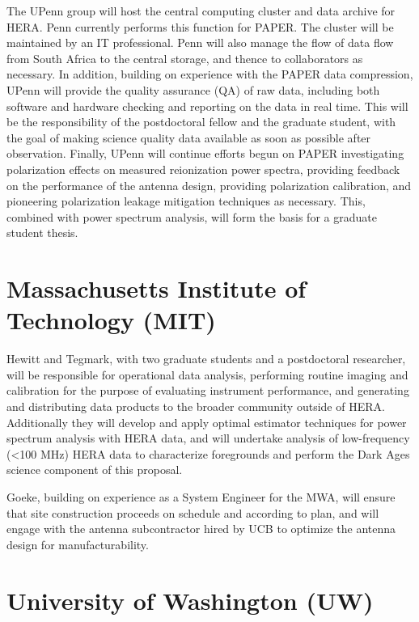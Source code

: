 \documentclass[preprint]{aastex}
\begin{document}
The UPenn group will host the central computing
cluster and data archive for HERA. Penn currently performs this function for
PAPER. The cluster will be maintained by an IT professional. Penn will also
manage the flow of data flow from South Africa to the central storage, and
thence to collaborators as necessary.  In addition, building on experience
with the PAPER data compression, UPenn will provide the quality
assurance (QA) of raw data, including both software and hardware checking and
reporting on the data in real time. This will be the responsibility of the
postdoctoral fellow and the graduate student, with the goal of making science
quality data available as soon as possible after observation.  
Finally, UPenn will continue efforts begun on PAPER
investigating polarization effects on measured reionization power spectra,
providing feedback on the performance of the antenna design, providing
polarization calibration, and pioneering polarization leakage mitigation
techniques as necessary. This, combined with power spectrum analysis, will form
the basis for a graduate student thesis.

\section*{Massachusetts Institute of Technology (MIT)}

Hewitt and Tegmark, with two graduate students and a postdoctoral
researcher, will be responsible for 
operational data analysis, performing routine imaging and calibration
for the purpose of evaluating instrument performance, and generating
and distributing data products to the broader community outside of HERA.
Additionally they will develop and apply optimal estimator techniques
for power spectrum analysis with HERA data, and will undertake analysis
of low-frequency (\textless100 MHz) HERA data to characterize foregrounds and
perform the Dark Ages science component of this proposal.

Goeke, building on experience as a System Engineer for the
MWA, will
ensure that site construction proceeds on schedule and according to plan,
and will engage with the antenna subcontractor hired by UCB to
optimize the antenna design for manufacturability.


\section*{University of Washington (UW)}
\end{document}
